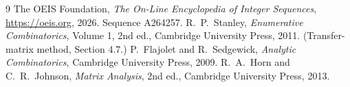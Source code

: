 \documentclass[11pt,a4paper]{article}
\theoremstyle{plain}
\theoremstyle{definition}
\begin{document}
\begin{thebibliography}{9}
 The OEIS Foundation, \emph{The On-Line Encyclopedia of Integer
Sequences}, \url{https://oeis.org}, 2026. Sequence A264257.
 R.~P.~Stanley, \emph{Enumerative Combinatorics}, Volume 1, 2nd ed.,
Cambridge University Press, 2011. (Transfer-matrix method, Section 4.7.)
 P.~Flajolet and R.~Sedgewick, \emph{Analytic Combinatorics}, Cambridge
University Press, 2009.
 R.~A.~Horn and C.~R.~Johnson, \emph{Matrix Analysis}, 2nd ed., Cambridge
University Press, 2013.
\end{thebibliography}
\end{document}

